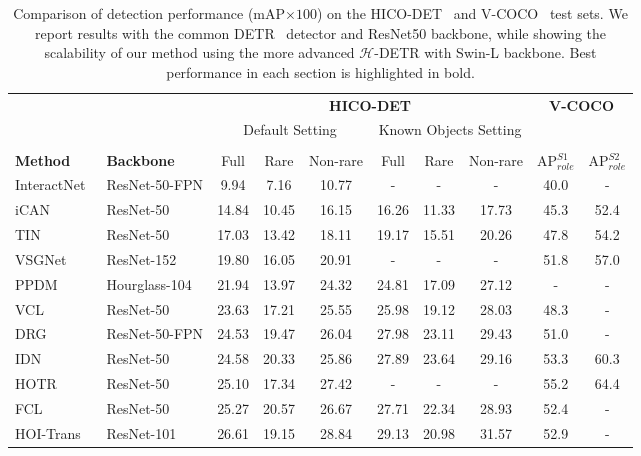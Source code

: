 \documentclass[10pt,twocolumn,letterpaper]{article}
\begin{document}
\begin{table*}[t]\small
   \centering
    \caption{Comparison of detection performance (mAP$\times100$) on the HICO-DET~\cite{hicodet} and V-COCO~\cite{vcoco} test sets. We report results with the common DETR~\cite{detr} detector and ResNet50 backbone, while showing the scalability of our method using the more advanced $\mathcal{H}$-DETR with Swin-L backbone. Best performance in each section is highlighted in bold.}
    \label{tab:results}
    \begin{tabularx}{\linewidth}{@{\extracolsep{\fill}} l l cccccccc}
       \toprule
     & & \multicolumn{6}{c}{\textbf{HICO-DET}} & \multicolumn{2}{c}{\textbf{V-COCO}} \\ [4pt]
     & & \multicolumn{3}{c}{Default Setting} & \multicolumn{3}{c}{Known Objects Setting} & & \\ 
     \cline{3-5}\cline{6-8}\cline{9-10} \\ [-8pt]
       \textbf{Method} & \textbf{Backbone} & Full & Rare & Non-rare & Full & Rare & Non-rare & AP$_{role}^{S1}$ & AP$_{role}^{S2}$ \\
       \midrule
      InteractNet~\cite{interactnet} & ResNet-50-FPN & 9.94 & 7.16 & 10.77 & - & - & - & 40.0 & - \\
      iCAN~\cite{ican} & ResNet-50 & 14.84 & 10.45 & 16.15 & 16.26 & 11.33 & 17.73 & 45.3 & 52.4 \\
      TIN~\cite{tin} & ResNet-50 & 17.03 & 13.42 & 18.11 & 19.17 & 15.51 & 20.26 & 47.8 & 54.2 \\
      VSGNet~\cite{vsgnet} & ResNet-152 & 19.80 & 16.05 & 20.91 & - & - & - & 51.8 & 57.0 \\
      PPDM~\cite{ppdm} & Hourglass-104 & 21.94 & 13.97 & 24.32 & 24.81 & 17.09 & 27.12 & - & - \\
      VCL~\cite{vcl} & ResNet-50 & 23.63 & 17.21 & 25.55 & 25.98 & 19.12 & 28.03 & 48.3 & - \\
      DRG~\cite{drg} & ResNet-50-FPN & 24.53 & 19.47 & 26.04 & 27.98 & 23.11 & 29.43 & 51.0 & - \\
      IDN~\cite{idn} & ResNet-50 & 24.58 & 20.33 & 25.86 & 27.89 & 23.64 & 29.16 & 53.3 & 60.3 \\
      HOTR~\cite{hotr} & ResNet-50 & 25.10 & 17.34 & 27.42 & - & - & - & 55.2 & 64.4 \\
      FCL~\cite{fcl} & ResNet-50 & 25.27 & 20.57 & 26.67 & 27.71 & 22.34 & 28.93 & 52.4 & - \\
      HOI-Trans~\cite{hoitrans} & ResNet-101 & 26.61 & 19.15 & 28.84 & 29.13 & 20.98 & 31.57 & 52.9 & - \\

\end{tabularx}
\end{table*}
\end{document}
